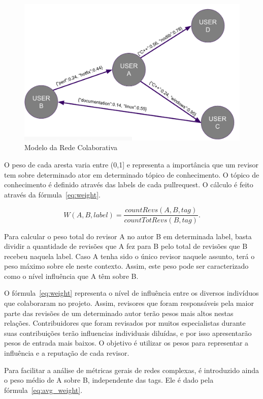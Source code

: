 \documentclass[a4paper,12pt]{monografia}
\theoremstyle{plain}
\theoremstyle{definition}
\theoremstyle{remark}
\begin{document}
\begin{figure}[!htbp]
 \includegraphics[width=\textwidth]{ger}
 \caption{Modelo da Rede Colaborativa}\label{fig:ger}
\end{figure}

O peso de cada aresta varia entre (0,1] e representa a importância que um revisor tem sobre determinado ator em determinado tópico de conhecimento. O tópico de conhecimento é definido através das labels de cada pullrequest. O cálculo é feito através da fórmula~\ref{eq:weight}.

\begin{equation}\label{eq:weight}
	W(A,B,label) = \dfrac{countRevs(A,B,tag)}{countTotRevs(B, tag)}.
\end{equation}

Para calcular o peso total do revisor A no autor B em determinada label, basta dividir a quantidade de revisões que A fez para B pelo total de revisões que B recebeu naquela label. Caso A tenha sido o único revisor naquele assunto, terá o peso máximo sobre ele neste contexto. Assim, este peso pode ser caracterizado como o nível influência que A têm sobre B.

O fórmula~\ref{eq:weight} representa o nível de influência entre os diversos indivíduos que colaboraram no projeto. Assim, revisores que foram responsáveis pela maior parte das revisões de um determinado autor terão pesos mais altos nestas relações. Contribuidores que foram revisados por muitos especialistas durante suas contribuições terão influencias individuais diluídas, e por isso apresentarão pesos de entrada mais baixos. O objetivo é utilizar os pesos para representar a influência e a reputação de cada revisor.

Para facilitar a análise de métricas gerais de redes complexas, é introduzido ainda o peso médio de A sobre B, independente das tags. Ele é dado pela fórmula~\ref{eq:avg_weight}.
\end{document}
